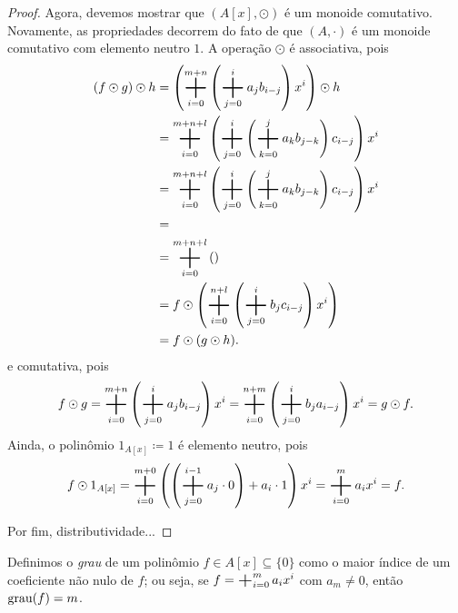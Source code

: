 \begin{proof}
	Agora, devemos mostrar que $(A[x],\odot)$ é um monoide comutativo. Novamente, as propriedades decorrem do fato de que $(A,\cdot)$ é um monoide comutativo com elemento neutro $1$. A operação $\odot$ é associativa, pois
	\begin{equation*}
	\begin{split}
	(f \odot g) \odot h &= \left( \bigplus_{i=0}^{m+n} \left(\bigplus_{j=0}^i a_jb_{i-j}\right)x^i \right) \odot h \\
		&= \bigplus_{i=0}^{m+n+l} \left( \bigplus_{j=0}^{i}\left(\bigplus_{k=0}^j a_kb_{j-k}\right)c_{i-j}\right)x^i \\
		&= \bigplus_{i=0}^{m+n+l} \left( \bigplus_{j=0}^{i}\left(\bigplus_{k=0}^j a_kb_{j-k}\right)c_{i-j}\right)x^i \\
		&= \\
		&= \bigplus_{i=0}^{m+n+l} \left( \right) \\
		&= f \odot \left( \bigplus_{i=0}^{n+l} \left(\bigplus_{j=0}^i b_jc_{i-j}\right)x^i \right) \\
		&= f \odot (g \odot h).
	 \end{split}
	 \end{equation*}
e comutativa, pois
	\begin{equation*}
	f \odot g = \bigplus_{i=0}^{m+n} \left(\bigplus_{j=0}^i a_jb_{i-j}\right)x^i = \bigplus_{i=0}^{n+m} \left(\bigplus_{j=0}^i b_ja_{i-j}\right)x^i = g \odot f.
	 \end{equation*}
Ainda, o polinômio $1_{A[x]} \coloneqq 1$ é elemento neutro, pois
	\begin{equation*}
	f \odot 1_{A[x]} = \bigplus_{i=0}^{m+0} \left(\left(\bigplus_{j=0}^{i-1} a_j \cdot 0 \right) + a_i \cdot 1\right)x^i = \bigplus_{i=0}^m a_ix^i = f.
	 \end{equation*}

	 Por fim, distributividade...
\end{proof}

\begin{defi}
	Definimos o \emph{grau} de um polinômio $f \in A[x] \subseteq \{0\}$ como o maior índice de um coeficiente não nulo de $f$; ou seja, se $f=\bigplus_{i=0}^m a_ix^i$ com $a_m \neq 0$, então $\operatorname{grau}(f)=m$.
\end{defi}

